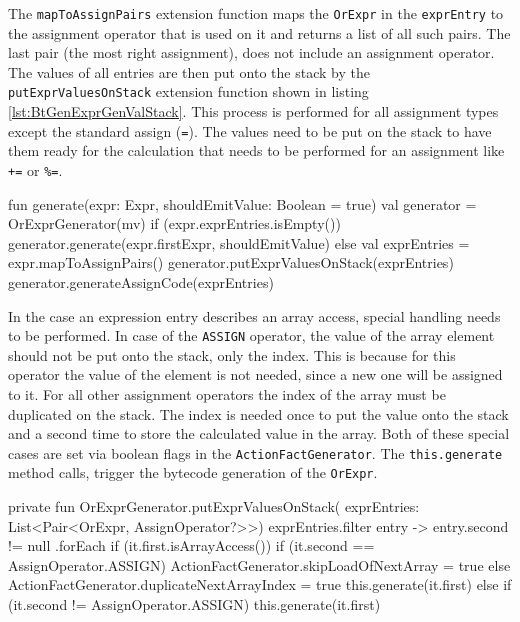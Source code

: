 The \verb|mapToAssignPairs| extension function maps the \verb|OrExpr| in the \verb|exprEntry| to the assignment operator that is used on it and returns a list of all such pairs. The last pair (the most right assignment), does not include an assignment operator. The values of all entries are then put onto the stack by the \verb|putExprValuesOnStack| extension function shown in listing \ref{lst:BtGenExprGenValStack}. This process is performed for all assignment types except the standard assign (\verb|=|). The values need to be put on the stack to have them ready for the calculation that needs to be performed for an assignment like \verb|+=| or \verb|%=|. 



\begin{KotlinCode}[float,numbers=none,caption=Implementation of the \texttt{generate} method of the \texttt{ExpressionGenerator}., label=lst:BtGenExprGenGen]
fun generate(expr: Expr, shouldEmitValue: Boolean = true) {
    val generator = OrExprGenerator(mv)
    if (expr.exprEntries.isEmpty()) {
        generator.generate(expr.firstExpr, shouldEmitValue)
    } else {
        val exprEntries = expr.mapToAssignPairs()
        generator.putExprValuesOnStack(exprEntries)
        generator.generateAssignCode(exprEntries)
    }
}  
\end{KotlinCode}

In the case an expression entry describes an array access, special handling needs to be performed. In case of the \verb|ASSIGN| operator, the value of the array element should not be put onto the stack, only the index. This is because for this operator the value of the element is not needed, since a new one will be assigned to it. For all other assignment operators the index of the array must be duplicated on the stack. The index is needed once to put the value onto the stack and a second time to store the calculated value in the array. Both of these special cases are set via boolean flags in the \verb|ActionFactGenerator|. The \verb|this.generate| method calls, trigger the bytecode generation of the \verb|OrExpr|.


\begin{KotlinCode}[float,numbers=none,caption=Implementation of the \texttt{putExprValuesOnStack} extension function in the \texttt{ExpressionGenerator}., label=lst:BtGenExprGenValStack]
    private fun OrExprGenerator.putExprValuesOnStack(
        exprEntries: List<Pair<OrExpr, AssignOperator?>>) {
        exprEntries.filter { entry ->
            entry.second != null
        }.forEach {
            if (it.first.isArrayAccess()) {
                if (it.second == AssignOperator.ASSIGN) {
                    ActionFactGenerator.skipLoadOfNextArray = true
                } else {
                    ActionFactGenerator.duplicateNextArrayIndex = true
                }
                this.generate(it.first)
            } else {
                if (it.second != AssignOperator.ASSIGN) {
                    this.generate(it.first)
                }
            }
        }
    }
    \end{KotlinCode}


